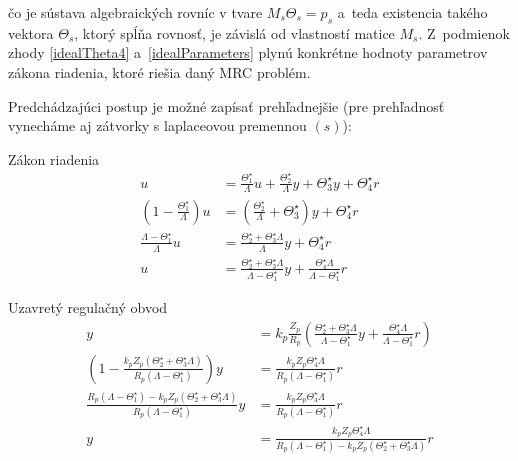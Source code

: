 \documentclass[a4paper, 10pt, ]{article}
\begin{document}
čo je sústava algebraických rovníc v tvare $M_s \Theta_s = p_s$ a~teda existencia takého vektora $\Theta_s$, ktorý spĺňa rovnosť, je závislá od vlastností matice $M_s$. Z~podmienok zhody \eqref{idealTheta4} a~\eqref{idealParameters} plynú konkrétne hodnoty parametrov zákona riadenia, ktoré riešia daný MRC problém.

Predchádzajúci postup je možné zapísať prehľadnejšie (pre prehľadnosť vynecháme aj zátvorky s laplaceovou premennou $(s)$):

Zákon riadenia
\begin{subequations}
	\begin{align}
		u
		&=
		\frac{\Theta_1^\star}{\Lambda}
		u
		+
		\frac{\Theta_2^\star}{\Lambda}
		y
		+
		\Theta_3^\star
		y
		+
		\Theta_4^\star
		r
		\\
		\left(
			1
			-
			\frac{\Theta_1^\star}{\Lambda}
		\right)
		u
		&=
		\left(
			\frac{\Theta_2^\star}{\Lambda}
			+
			\Theta_3^\star
		\right)
		y
		+
		\Theta_4^\star
		r
		\\
		\frac{\Lambda - \Theta_1^\star}{\Lambda}
		u
		&=
		\frac{
			\Theta_2^\star
			+
			\Theta_3^\star\Lambda
			}{
			\Lambda}
		y
		+
		\Theta_4^\star
		r
		\\
		u
		&=
		\frac{
			\Theta_2^\star
			+
			\Theta_3^\star\Lambda
			}{
			\Lambda - \Theta_1^\star}
		y
		+
		\frac{
		\Theta_4^\star \Lambda
		}{
		\Lambda - \Theta_1^\star}
		r
	\end{align}
\end{subequations}

Uzavretý regulačný obvod
\begin{subequations}
	\begin{align}
		y
		&=
		k_p
		\frac{Z_p}{R_p}
		\left(
				\frac{
			\Theta_2^\star
			+
			\Theta_3^\star\Lambda
			}{
			\Lambda - \Theta_1^\star}
		y
		+
		\frac{
		\Theta_4^\star \Lambda
		}{
		\Lambda - \Theta_1^\star}
		r
		\right)
\\
		\left(
			1
			-
			\frac{
				k_p
				Z_p
				\left(
					\Theta_2^\star
					+
					\Theta_3^\star\Lambda
				\right)
				}{
				R_p
				\left(
					\Lambda - \Theta_1^\star
				\right)}
		\right)
		y
		&=
		\frac{
			k_p
			Z_p
			\Theta_4^\star
			\Lambda
			}{
			R_p
			\left(
				\Lambda - \Theta_1^\star
			\right)}
		r
\\
		\frac{
			R_p
			\left(
				\Lambda - \Theta_1^\star
			\right)
			-
			k_p
			Z_p
			\left(
				\Theta_2^\star
				+
				\Theta_3^\star\Lambda
			\right)
			}{
			R_p
			\left(
				\Lambda - \Theta_1^\star
			\right)}
		y
		&=
		\frac{
			k_p
			Z_p
			\Theta_4^\star
			\Lambda
			}{
			R_p
			\left(
				\Lambda - \Theta_1^\star
			\right)}
		r
\\
		y
		&=
		\frac{
			k_p
			Z_p
			\Theta_4^\star
			\Lambda
			}{
			R_p
			\left(
				\Lambda - \Theta_1^\star
			\right)
			-
			k_p
			Z_p
			\left(
				\Theta_2^\star
				+
				\Theta_3^\star\Lambda
			\right)}
		r
	\end{align}
\end{subequations}
\end{document}
